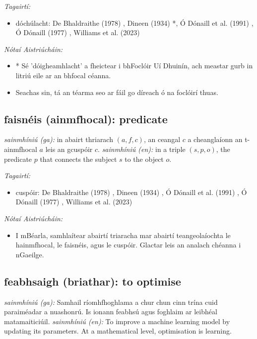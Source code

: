 \documentclass{article}
\begin{document}
 \noindent \textit{Tagairtí:}
\begin{itemize}
	\item dóchúlacht: De Bhaldraithe (1978) \cite{de-bhaldraithe}, Dineen (1934) \cite{dineen}*, Ó Dónaill et al. (1991) \cite{focloir-beag}, Ó Dónaill (1977) \cite{odonaill}, Williams et al. (2023) \cite{storchiste}
\end{itemize}

 \noindent \textit{Nótaí Aistriúcháin:}
\begin{itemize}
	\item * Sé 'dóigheamhlacht' a fheictear i bhFoclóir Uí Dhuinín, ach meastar gurb in litriú eile ar an bhfocal céanna.
	\item Seachas sin, tá an téarma seo ar fáil go díreach ó na foclóirí thuas.
\end{itemize}


\subsection*{faisnéis (ainmfhocal): predicate} 
 \noindent \textit{sainmhíniú (ga):} in abairt thriarach $(a,f,c)$, an ceangal $c$ a cheanglaíonn an t-ainmfhocal $a$ leis an gcuspóir $c$.
\newline\newline
 \noindent \textit{sainmhíniú (en):} in a triple $(s,p,o)$, the predicate $p$ that connects the subject $s$ to the object $o$.
\newline

 \noindent \textit{Tagairtí:}
\begin{itemize}
	\item cuspóir: De Bhaldraithe (1978) \cite{de-bhaldraithe}, Dineen (1934) \cite{dineen}, Ó Dónaill et al. (1991) \cite{focloir-beag}, Ó Dónaill (1977) \cite{odonaill}, Williams et al. (2023) \cite{storchiste}
\end{itemize}

 \noindent \textit{Nótaí Aistriúcháin:}
\begin{itemize}
	\item I mBéarla, samhlaítear abairtí triaracha mar abairtí teangeolaíochta le hainmfhocal, le faisnéis, agus le cuspóir. Glactar leis an analach chéanna i nGaeilge.
\end{itemize}


\subsection*{feabhsaigh (briathar): to optimise} 
 \noindent \textit{sainmhíniú (ga):} Samhail ríomhfhoghlama a chur chun cinn trína cuid paraiméadar a nuashonrú. Is ionann feabhsú agus foghlaim ar leibhéal matamaiticiúil.
\newline\newline
 \noindent \textit{sainmhíniú (en):} To improve a machine learning model by updating its parameters. At a mathematical level, optimisation is learning.
\newline
\end{document}
